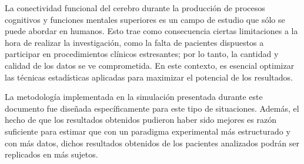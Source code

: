 \documentclass[jou]{apa6}
\begin{document}
La conectividad funcional del cerebro durante la producción de procesos cognitivos y funciones mentales superiores es 
un campo de estudio que sólo se puede abordar en humanos. Esto trae como consecuencia ciertas limitaciones a la hora 
de realizar la investigación, como la falta de pacientes dispuestos a participar en procedimientos clínicos estresantes; 
por lo tanto, la cantidad y calidad de los datos se ve comprometida. En este contexto, es esencial optimizar las 
técnicas estadísticas aplicadas para maximizar el potencial de los resultados.

La metodología implementada en la simulación presentada durante este documento fue diseñada específicamente para este 
tipo de situaciones. Además, el hecho de que los resultados obtenidos pudieron haber sido mejores es razón suficiente 
para estimar que con un paradigma experimental más estructurado y con más datos, dichos resultados obtenidos de los 
pacientes analizados podrán ser replicados en más sujetos.

\printbibliography
\end{document}
